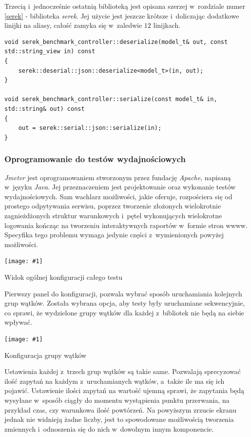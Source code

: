 \documentclass[12pt]{article}
\newcommand{\n}{\newline}
\newcommand{\putss}[3]{
\begin{screenshot}[H]
	\centering
	\texttt{[image: \#1]}
	\caption{#2}
	\label{#3}
	\medskip
\end{screenshot}
}
\newcommand{\nonpl}[1]{{\it #1}}
\newcommand{\Jmeter}{\nonpl{Jmeter}\texttrademark}
\newcommand{\serek}{\nonpl{serek}}
\begin{document}
{{{				Trzecią i~jednocześnie ostatnią biblioteką jest opisana szerzej w~rozdziale numer \ref{serek} - biblioteka \serek.
				Jej użycie jest jeszcze krótsze i~doliczając dodatkowe linijki na aliasy, całość zamyka się w~zaledwie $12$ linijkach.\n

				\begin{lstlisting}[frame=single]
void serek_benchmark_controller::deserialize(model_t& out, const std::string_view in) const
{
	serek::deserial::json::deserialize<model_t>(in, out);
}

void serek_benchmark_controller::serialize(const model_t& in, std::string& out) const
{
	out = serek::serial::json::serialize(in);
}
				\end{lstlisting}
			}

			{
				\subsubsection{Oprogramowanie do testów wydajnościowych}

				\Jmeter\cite{jmeter} jest oprogramowaniem stworzonym przez fundację \nonpl{Apache}, napisaną w~języku \nonpl{Java}. Jej przeznaczeniem
				jest projektowanie oraz wykonanie testów wydajnościowych. Sam wachlarz możliwości, jakie oferuje, rozpościera się od prostego odpytywania serwisu, poprzez
				tworzenie złożonych wielokrotnie zagnieżdżonych struktur warunkowych i~pętel wykonujących wielokrotne logowania kończąc na tworzeniu interaktywnych
				raportów w~formie stron wwww. Specyfika tego problemu wymaga jedynie części z~wymienionych powyżej możliwości.

				\putss{./img/jmeter_ss/main_pane.png}{ Widok ogólnej konfiguracji całego testu}{jmeter_main_config}

				Pierwszy panel do konfiguracji, pozwala wybrać sposób uruchamiania kolejnych grup wątków. Została wybrana opcja, aby testy były uruchamiane sekwencyjnie,
				co sprawi, że wydzielone grupy wątków dla każdej z~bibliotek nie będą na siebie wpływać.\n

				\putss{./img/jmeter_ss/thread_group_config.png}{ Konfiguracja grupy wątków}{jmeter_thread_config}

				Ustawienia każdej z~trzech grup wątków są takie same. Pozwalają sprecyzować ilość zapytań na każdym z~uruchamianych wątków, a~także ile ma się ich pojawić.
				Ustawienie ilości zapytań na wartość ujemną sprawi, że zapytania będą wysyłane w~sposób ciągły do momentu wystąpienia punktu przerwania, na przykład czas, czy warunkowa
				ilość powtórzeń. Na powyższym zrzucie ekranu jednak nie widnieją żadne liczby, jest to spowodowane możliwością tworzenia zmiennych i~odnoszenia się do nich w~dowolnym innym
				komponencie.\n

}}}
\end{document}
